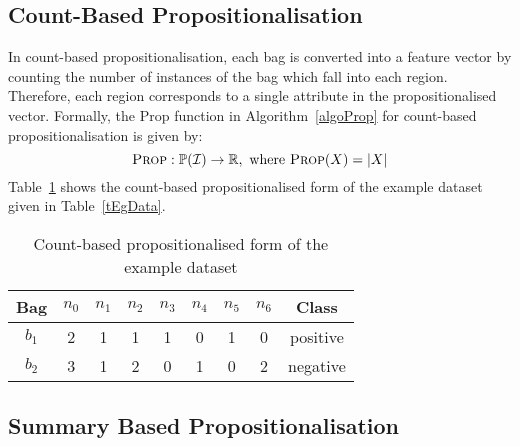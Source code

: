 \documentclass[a4paper,12pt]{report} %
\newcommand{\real}{\mathbb{R}}
\newcommand{\mcl}[1]{\mathcal{#1}}
\newcommand{\power}{\mathbb{P}}
\begin{document}
\subsection{Count-Based Propositionalisation}

In count-based propositionalisation, 
    each bag is converted into a feature vector by
    counting the number of instances of the bag which
    fall into each region.
Therefore, each region corresponds to a single attribute in the 
    propositionalised vector.
Formally, the {\sc Prop} function in Algorithm~\ref{algoProp} 
    for count-based propositionalisation is given by:
$$ \textrm{\sc Prop}: \power(\mcl{I}) \to \real,\mathrm{~where~}\textrm{\sc Prop}(X) = |X|$$
Table~\ref{tEgPropCount} shows the count-based propositionalised form of 
    the example dataset given in Table~\ref{tEgData}.

\begin{table}
\begin{center}
\begin{tabular}{*{9}{c}}
    \toprule
    Bag & $n_0$ & $n_1$ & $n_2$ & $n_3$ & $n_4$ & $n_5$ & $n_6$ & Class \\
    \midrule
    $b_1$ & 2 &     1 & 1 &     1 & 0 & 1 & 0 & positive\\
    $b_2$ & 3 &     1 & 2 &     0 & 1 & 0 & 2 & negative\\
    \bottomrule
    
\end{tabular}
\end{center}
\caption{Count-based propositionalised form of the example dataset}
\label{tEgPropCount}
\end{table}    

\subsection{Summary Based Propositionalisation}
\end{document}
